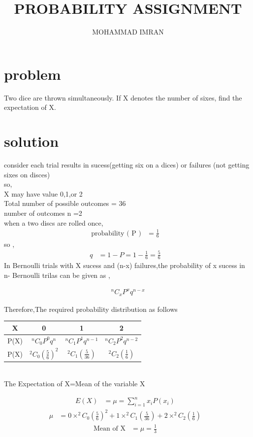 \documentclass[journal,12pt,two column]{article}
\title{PROBABILITY ASSIGNMENT}
\author{MOHAMMAD IMRAN}
\begin{document}
\maketitle
\bigskip


 \section{problem }
 Two dice are thrown simultaneously. If X denotes the number of sixes, find the
expectation of X.

\section{solution }
consider each trial results in sucess(getting six on a dices) or failures (not getting sixes on disces)\\
so,\\
X may have value 0,1,or 2\\
Total number of possible outcomes = 36\\
number of outcomes n =2\\
when a  two discs are rolled once,\\


\begin{align}
\text{probability ( P )} &=
\frac{1}{6}&\label{1}
 \end{align}
 so ,
 \begin{align}
  q &= 1-P = 1-\frac{1}{6} = \frac{5}{6}&\label{2}
 \end{align}
 In Bernoulli trials with X sucess and (n-x) failures,the probability of x sucess in n- Bernoulli trilas can be given as ,
 
\begin{align}
 &^nC_xP^xq^{n-x}&\label{3}
\end{align}

Therefore,The required probability distribution as follows\\

 \begin{tabular}{ |c |c |c |c |}
 \hline
 X  &  0  &  1  &  2\\
 \hline
 
 P(X)  &  $^nC_0P^0q^n$  &  $^nC_1P^1q^{n-1}$  &  $^nC_2P^2q^{n-2}$\\
 \hline
 
 P(X)  &   $^2C_0(\frac{5}{6})^2$ &  $^2C_1(\frac{5}{36})$ &   $^2C_2(\frac{1}{6})$ \\
 \hline
 
 \end{tabular}\\
 
 
 The Expectation of X=Mean of the variable X 
 
 \begin{align}
  E(X)&=\mu=\sum_{i=1}^{n} x_i P(x_i)&\label{4}
\end{align}
\begin{align}
\mu&=0\times^2C_0(\frac{5}{6})^2+1\times^2C_1(\frac{5}{36})+2\times^2C_2(\frac{1}{6})&\label{5}
\end{align}
\begin{align}
 \text{Mean of X}&=\mu=\frac{1}{3}&\label{6}
 \end{align}
 
\end{document}
